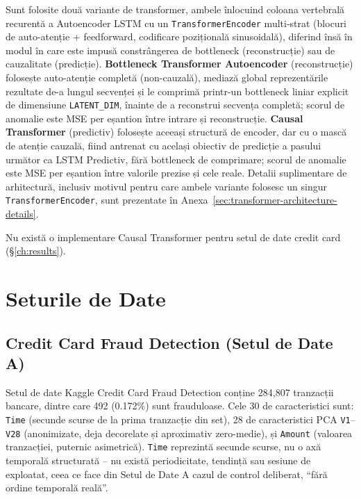 Sunt folosite două variante de transformer, ambele înlocuind coloana vertebrală recurentă a Autoencoder LSTM cu un \texttt{TransformerEncoder} multi-strat (blocuri de auto-atenție + feedforward, codificare pozițională sinusoidală), diferind însă în modul în care este impusă constrângerea de bottleneck (reconstrucție) sau de cauzalitate (predicție).
\textbf{Bottleneck Transformer Autoencoder} (reconstrucție) folosește auto-atenție completă (non-cauzală), mediază global reprezentările rezultate de-a lungul secvenței și le comprimă printr-un bottleneck liniar explicit de dimensiune \texttt{LATENT\_DIM}, înainte de a reconstrui secvența completă; scorul de anomalie este MSE per eșantion între intrare și reconstrucție.
\textbf{Causal Transformer} (predictiv) folosește aceeași structură de encoder, dar cu o mască de atenție cauzală, fiind antrenat cu același obiectiv de predicție a pasului următor ca LSTM Predictiv, fără bottleneck de comprimare; scorul de anomalie este MSE per eșantion între valorile prezise și cele reale.
Detalii suplimentare de arhitectură, inclusiv motivul pentru care ambele variante folosesc un singur \texttt{TransformerEncoder}, sunt prezentate în Anexa~\ref{sec:transformer-architecture-details}.

Nu există o implementare Causal Transformer pentru setul de date credit card (\S\ref{ch:results}).

\section{Seturile de Date}
\label{sec:datasets-overview}

\subsection{Credit Card Fraud Detection (Setul de Date A)}

Setul de date Kaggle Credit Card Fraud Detection conține 284{,}807 tranzacții bancare, dintre care 492 (0.172\%) sunt frauduloase. Cele 30 de caracteristici sunt: \texttt{Time} (secunde scurse de la prima tranzacție din set), 28 de caracteristici PCA \texttt{V1}--\texttt{V28} (anonimizate, deja decorelate și aproximativ zero-medie), și \texttt{Amount} (valoarea tranzacției, puternic asimetrică). \texttt{Time} reprezintă secunde scurse, nu o axă temporală structurată -- nu există periodicitate, tendință sau sesiune de exploatat, ceea ce face din Setul de Date A cazul de control deliberat, \enquote{fără ordine temporală reală}.

